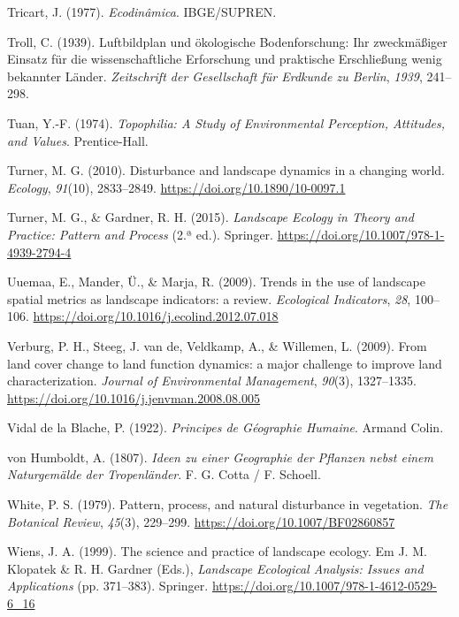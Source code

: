 \documentclass[
  portuguese,
  11pt,
  a4paper,
  open=any]{scrbook}
\newlength{\cslhangindent}
\newenvironment{CSLReferences}[2] %
 {\begin{list}{}{%
  \setlength{\itemindent}{0pt}
  \setlength{\leftmargin}{0pt}
  \setlength{\parsep}{0pt}
  \ifodd #1
   \setlength{\leftmargin}{\cslhangindent}
   \setlength{\itemindent}{-1\cslhangindent}
  \fi
  \setlength{\itemsep}{#2\baselineskip}}}
 {\end{list}}
\begin{document}
\begin{CSLReferences}{1}{0}
Tricart, J. (1977). \emph{Ecodinâmica}. IBGE/SUPREN.

Troll, C. (1939). Luftbildplan und {ö}kologische Bodenforschung: Ihr
zweckm{ä}{ß}iger Einsatz f{ü}r die wissenschaftliche Erforschung und
praktische Erschlie{ß}ung wenig bekannter L{ä}nder. \emph{Zeitschrift
der Gesellschaft f{ü}r Erdkunde zu Berlin}, \emph{1939}, 241--298.

Tuan, Y.-F. (1974). \emph{Topophilia: A Study of Environmental
Perception, Attitudes, and Values}. Prentice-Hall.

Turner, M. G. (2010). Disturbance and landscape dynamics in a changing
world. \emph{Ecology}, \emph{91}(10), 2833--2849.
\url{https://doi.org/10.1890/10-0097.1}

Turner, M. G., \& Gardner, R. H. (2015). \emph{Landscape Ecology in
Theory and Practice: Pattern and Process} (2.ª ed.). Springer.
\url{https://doi.org/10.1007/978-1-4939-2794-4}

Uuemaa, E., Mander, Ü., \& Marja, R. (2009). Trends in the use of
landscape spatial metrics as landscape indicators: a review.
\emph{Ecological Indicators}, \emph{28}, 100--106.
\url{https://doi.org/10.1016/j.ecolind.2012.07.018}

Verburg, P. H., Steeg, J. van de, Veldkamp, A., \& Willemen, L. (2009).
From land cover change to land function dynamics: a major challenge to
improve land characterization. \emph{Journal of Environmental
Management}, \emph{90}(3), 1327--1335.
\url{https://doi.org/10.1016/j.jenvman.2008.08.005}

Vidal de la Blache, P. (1922). \emph{Principes de G{é}ographie Humaine}.
Armand Colin.

von Humboldt, A. (1807). \emph{Ideen zu einer Geographie der Pflanzen
nebst einem Naturgem{ä}lde der Tropenl{ä}nder}. F. G. Cotta / F.
Schoell.

White, P. S. (1979). Pattern, process, and natural disturbance in
vegetation. \emph{The Botanical Review}, \emph{45}(3), 229--299.
\url{https://doi.org/10.1007/BF02860857}

Wiens, J. A. (1999). The science and practice of landscape ecology. Em
J. M. Klopatek \& R. H. Gardner (Eds.), \emph{Landscape Ecological
Analysis: Issues and Applications} (pp. 371--383). Springer.
\url{https://doi.org/10.1007/978-1-4612-0529-6_16}


\end{CSLReferences}
\end{document}
